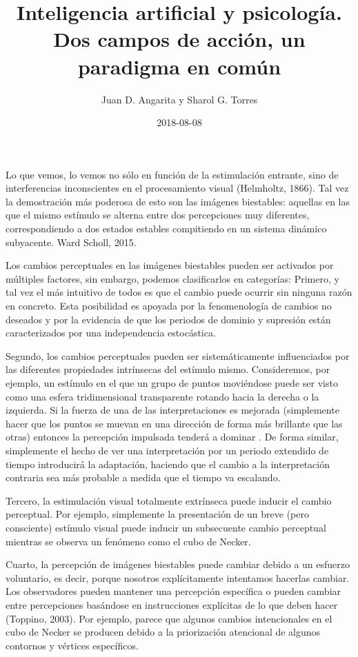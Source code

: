 \documentclass[jou]{apa6}
\title{Inteligencia artificial y psicología. Dos campos de acción, un paradigma en común}
\author{Juan D. Angarita y Sharol G. Torres}
\affiliation{Universidad Popular del Cesar}
\date{2018-08-08}
\begin{document}
\maketitle

Lo que vemos, lo vemos no sólo en función de la estimulación entrante, sino de
interferencias inconscientes en el procesamiento visual (Helmholtz, 1866). Tal vez la
demostración más poderosa de esto son las imágenes biestables: aquellas en las que el mismo
estímulo se alterna entre dos percepciones muy diferentes, correspondiendo a dos estados 
estables compitiendo en un sistema dinámico subyacente. Ward Scholl, 2015.

Los cambios perceptuales en las imágenes biestables pueden ser activados por múltiples
factores, sin embargo, podemos clasificarlos en categorías: Primero, y tal vez el más intuitivo
de todos es que el cambio puede ocurrir sin ninguna razón en concreto. Esta posibilidad es
apoyada por la fenomenología de cambios no deseados y por la evidencia de que los periodos
de dominio y supresión están caracterizados por una independencia estocástica.

Segundo, los cambios perceptuales pueden ser sistemáticamente influenciados por las
diferentes propiedades intrínsecas del estímulo mismo. Consideremos, por ejemplo, un
estímulo en el que un grupo de puntos moviéndose puede ser visto como una esfera
tridimensional transparente rotando hacia la derecha o la izquierda. Si la fuerza de una de las
interpretaciones es mejorada (simplemente hacer que los puntos se muevan en una dirección
de forma más brillante que las otras) entonces la percepción impulsada tenderá a dominar
. De forma similar, simplemente el hecho de ver una
interpretación por un periodo extendido de tiempo introducirá la adaptación, haciendo que el
cambio a la interpretación contraria sea más probable a medida que el tiempo va escalando.

Tercero, la estimulación visual totalmente extrínseca puede inducir el cambio perceptual.
Por ejemplo, simplemente la presentación de un breve (pero consciente) estímulo visual
puede inducir un subsecuente cambio perceptual mientras se observa un fenómeno como el
cubo de Necker.

Cuarto, la percepción de imágenes biestables puede cambiar debido a un esfuerzo
voluntario, es decir, porque nosotros explícitamente intentamos hacerlas cambiar. Los
observadores pueden mantener una percepción específica o pueden cambiar entre
percepciones basándose en instrucciones explícitas de lo que deben hacer (Toppino, 2003).
Por ejemplo, parece que algunos cambios intencionales en el cubo de Necker se producen
debido a la priorización atencional de algunos contornos y vértices específicos.
\end{document}

